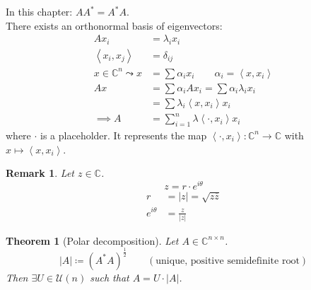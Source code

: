 \documentclass{article}
\newtheorem{theorem}{Theorem}  \numberwithin{theorem}{section}
\newtheorem{remark}{Remark}  \numberwithin{remark}{section}
\newcommand{\angel}[1]{\left\langle#1\right\rangle}
\newcommand{\card}[1]{\left|#1\right|}
\begin{document}
In this chapter: $AA^* = A^* A$. \\
There exists an orthonormal basis of eigenvectors:
\begin{align*}
  Ax_i &= \lambda_i x_i \\
  \angel{x_i, x_j} &= \delta_{ij} \\
  x \in \mathbb C^n \leadsto x &= \sum \alpha_i x_i \qquad \alpha_i = \angel{x, x_i} \\
  Ax &= \sum \alpha_i Ax_i = \sum \alpha_i \lambda_i x_i \\
    &= \sum \lambda_i \angel{x, x_i} x_i \\
  \implies A &= \sum_{i=1}^n \lambda \angel{\cdot, x_i} x_i
\end{align*}
where $\cdot$ is a placeholder. It represents the map $\angel{\cdot, x_i}: \mathbb C^n \to \mathbb C$ with $x \mapsto \angel{x, x_i}$.

\begin{remark}
  Let $z \in \mathbb C$.
  \[ z = r \cdot e^{i \theta} \]
  \begin{align*}
    r &= \card{z} = \sqrt{z \overline{z}} \\
    e^{i \theta} &= \frac{z}{\card{z}}
  \end{align*}
\end{remark}

\begin{theorem}[Polar decomposition] %
  Let $A \in \mathbb C^{n \times n}$.
  \[ \card{A} \coloneqq (A^* A)^{\frac12} \qquad (\text{unique, positive semidefinite root}) \]
  Then $\exists U \in \mathcal U(n)$ such that $A = U \cdot \card{A}$.
\end{theorem}
\end{document}
